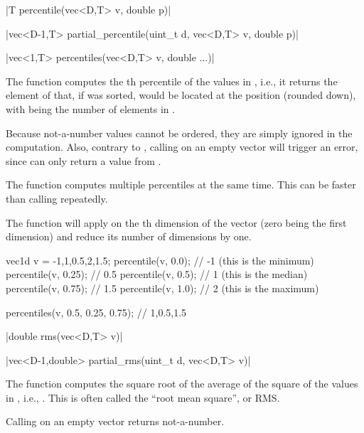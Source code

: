 \funcitem \cppinline|T percentile(vec<D,T> v, double p)| 

\cppinline|vec<D-1,T> partial_percentile(uint_t d, vec<D,T> v, double p)| 

\cppinline|vec<1,T> percentiles(vec<D,T> v, double ...)| 

The function  computes the th percentile of the values in , i.e., it returns the element of  that, if  was sorted, would be located at the position  (rounded down), with  being the number of elements in .

Because not-a-number values cannot be ordered, they are simply ignored in the computation. Also,
contrary to , calling  on an empty vector will trigger an error, since  can only return a value from .

The function  computes multiple percentiles at the same time. This can be faster than calling  repeatedly.

The function  will apply  on the th dimension of the vector (zero being the first dimension) and reduce its number of dimensions by one.

\begin{example}
\begin{cppcode}
vec1d v = {-1,1,0.5,2,1.5};
percentile(v, 0.0);  // -1 (this is the minimum)
percentile(v, 0.25); // 0.5
percentile(v, 0.5);  // 1 (this is the median)
percentile(v, 0.75); // 1.5
percentile(v, 1.0);  // 2 (this is the maximum)

percentiles(v, 0.5, 0.25, 0.75); // {1,0.5,1.5}
\end{cppcode}
\end{example}

\funcitem \cppinline|double rms(vec<D,T> v)| 

\cppinline|vec<D-1,double> partial_rms(uint_t d, vec<D,T> v)| 

The function  computes the square root of the average of the square of the values in , i.e., . This is often called the ``root mean square'', or RMS.

Calling  on an empty vector returns not-a-number.


